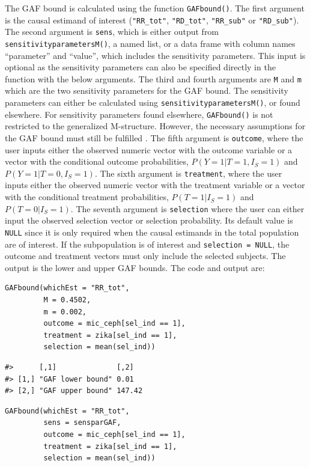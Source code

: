 The GAF bound is calculated using the function \texttt{GAFbound()}. The first argument
is the causal estimand of interest (\texttt{"RR\_tot"}, \texttt{"RD\_tot"}, \texttt{"RR\_sub"} or
\texttt{"RD\_sub"}). The second argument is \texttt{sens}, which is either output from
\texttt{sensitivityparametersM()}, a named list, or a data frame with column names
``parameter'' and ``value'', which includes the sensitivity parameters. This input
is optional as the sensitivity parameters can also be specified directly in the
function with the below arguments. The third and fourth arguments are \texttt{M} and
\texttt{m} which are the two sensitivity parameters for the GAF bound. The sensitivity
parameters can either be calculated using \texttt{sensitivityparametersM()}, or found
elsewhere. For sensitivity parameters found elsewhere, \texttt{GAFbound()} is not
restricted to the generalized M-structure. However, the necessary assumptions
for the GAF bound must still be fulfilled \citep{zetterstrom2024}. The fifth argument
is \texttt{outcome}, where the user inputs either the observed numeric vector with the
outcome variable or a vector with the conditional outcome probabilities,
\(P(Y=1|T=1,I_S=1)\) and \(P(Y=1|T=0,I_S=1)\). The sixth argument is \texttt{treatment},
where the user inputs either the observed numeric vector with the treatment
variable or a vector with the conditional treatment probabilities,
\(P(T=1|I_S=1)\) and \(P(T=0|I_S=1)\). The seventh argument is \texttt{selection} where the
user can either input the observed selection vector or selection probability.
Its default value is \texttt{NULL} since it is only required when the causal estimands
in the total population are of interest. If the subpopulation is of interest and
\texttt{selection\ =\ NULL}, the outcome and treatment vectors must only include the
selected subjects. The output is the lower and upper GAF bounds. The code and
output are:

\begin{verbatim}
GAFbound(whichEst = "RR_tot",
         M = 0.4502,
         m = 0.002, 
         outcome = mic_ceph[sel_ind == 1],
         treatment = zika[sel_ind == 1],
         selection = mean(sel_ind))
\end{verbatim}

\begin{verbatim}
#>      [,1]              [,2]  
#> [1,] "GAF lower bound" 0.01  
#> [2,] "GAF upper bound" 147.42
\end{verbatim}

\begin{verbatim}
GAFbound(whichEst = "RR_tot",
         sens = sensparGAF, 
         outcome = mic_ceph[sel_ind == 1],
         treatment = zika[sel_ind == 1],
         selection = mean(sel_ind))
\end{verbatim}

